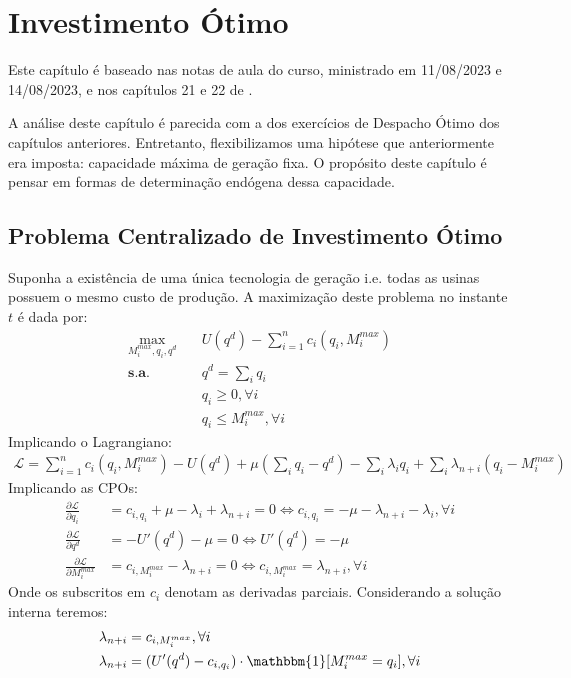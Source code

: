 \chapter{Investimento Ótimo}
\localtableofcontents 

Este capítulo é baseado nas notas de aula do curso, ministrado em 11/08/2023 e 14/08/2023, e nos capítulos 21 e 22 de \textcite{cretì_fontini_2019}.

A análise deste capítulo é parecida com a dos exercícios de Despacho Ótimo dos capítulos anteriores. Entretanto, flexibilizamos uma hipótese que anteriormente era imposta: capacidade máxima de geração fixa. O propósito deste capítulo é pensar em formas de determinação endógena dessa capacidade.

\section{Problema Centralizado de Investimento Ótimo}
Suponha a existência de uma única tecnologia de geração i.e. todas as usinas possuem o mesmo custo de produção. A maximização deste problema no instante $t$ é dada por:
\begin{align*}
    \max_{M_i^{max},q_i,q^d}&\quad U(q^d) - \sum_{i=1}^nc_i(q_i,M_i^{max})\\
    \textbf{s.a.}&\quad q^d=\sum_iq_i\\
    &\quad q_i\ge0,\forall i\\
    &\quad q_i\le M_i^{max},\forall i
\end{align*}
Implicando o Lagrangiano:
\begin{align*}
    \mathcal{L}=\sum_{i=1}^nc_i(q_i,M_i^{max})-U(q^d)+\mu\left(\sum_iq_i-q^d\right)-\sum_i\lambda_iq_i+\sum_i\lambda_{n+i}(q_i-M_i^{max})
\end{align*}
Implicando as CPOs:
\begin{align*}
    \frac{\partial\mathcal{L}}{\partial q_i}&=c_{i,q_i}+\mu-\lambda_i+\lambda_{n+i}=0\Longleftrightarrow c_{i,q_i} =-\mu-\lambda_{n+i}-\lambda_i,\forall i \\
    \frac{\partial\mathcal{L}}{\partial q^d}&=-U'(q^d)-\mu=0 \Longleftrightarrow  U'(q^d) = -\mu\\
    \frac{\partial\mathcal{L}}{\partial M_i^{max}}&=c_{i,M_i^{max}}-\lambda_{n+i}=0 \Longleftrightarrow c_{i,M_i^{max}}=\lambda_{n+i}, \forall i
\end{align*}
Onde os subscritos em $c_i$ denotam as derivadas parciais. Considerando a solução interna teremos:
\begin{align*}
    \lambda_{n+i}&=c_{i,M_i^{max}},\forall i\\
    \lambda_{n+i}&=(U'(q^d)-c_{i,q_i})\cdot\mathbbm{1}[M_i^{max}=q_i],\forall i
\end{align*}
